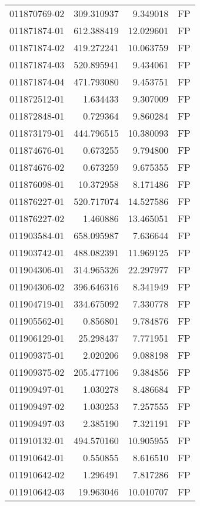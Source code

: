\begin{tabular}{lrrl}
011870769-02 &  309.310937 &     9.349018 &   FP \\
011871874-01 &  612.388419 &    12.029601 &   FP \\
011871874-02 &  419.272241 &    10.063759 &   FP \\
011871874-03 &  520.895941 &     9.434061 &   FP \\
011871874-04 &  471.793080 &     9.453751 &   FP \\
011872512-01 &    1.634433 &     9.307009 &   FP \\
011872848-01 &    0.729364 &     9.860284 &   FP \\
011873179-01 &  444.796515 &    10.380093 &   FP \\
011874676-01 &    0.673255 &     9.794800 &   FP \\
011874676-02 &    0.673259 &     9.675355 &   FP \\
011876098-01 &   10.372958 &     8.171486 &   FP \\
011876227-01 &  520.717074 &    14.527586 &   FP \\
011876227-02 &    1.460886 &    13.465051 &   FP \\
011903584-01 &  658.095987 &     7.636644 &   FP \\
011903742-01 &  488.082391 &    11.969125 &   FP \\
011904306-01 &  314.965326 &    22.297977 &   FP \\
011904306-02 &  396.646316 &     8.341949 &   FP \\
011904719-01 &  334.675092 &     7.330778 &   FP \\
011905562-01 &    0.856801 &     9.784876 &   FP \\
011906129-01 &   25.298437 &     7.771951 &   FP \\
011909375-01 &    2.020206 &     9.088198 &   FP \\
011909375-02 &  205.477106 &     9.384856 &   FP \\
011909497-01 &    1.030278 &     8.486684 &   FP \\
011909497-02 &    1.030253 &     7.257555 &   FP \\
011909497-03 &    2.385190 &     7.321191 &   FP \\
011910132-01 &  494.570160 &    10.905955 &   FP \\
011910642-01 &    0.550855 &     8.616510 &   FP \\
011910642-02 &    1.296491 &     7.817286 &   FP \\
011910642-03 &   19.963046 &    10.010707 &   FP \\

\end{tabular}
